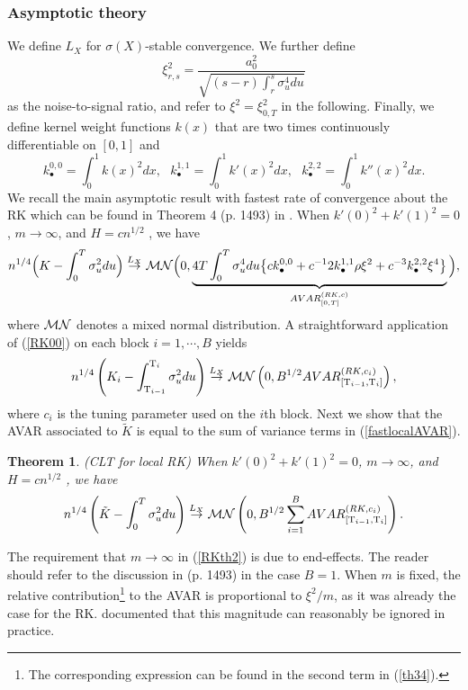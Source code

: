 \documentclass[11pt]{article}
\numberwithin{equation}{section}
\newcommand{\Tau}{\mathrm{T}}
\theoremstyle{plain}
\newtheorem{RK}[RK0]{Theorem}
\theoremstyle{remark}
\begin{document}
\subsubsection{Asymptotic theory}
We define $L_X$ for $\sigma(X)$-stable convergence. We further define 
$$\xi_{r,s}^2 = \frac{a_0^2}{\sqrt{ (s-r) \int_{r}^{s} \sigma_u^4 du}}$$
as the noise-to-signal ratio, and refer to $\xi^2 = \xi_{0,T}^2$ in the following. Finally, we define kernel weight functions $k(x)$ that are two times continuously differentiable on $[0,1]$ and 
$$k_{\bullet}^{0,0} = \int_0^1 k(x)^2 dx, \text{ } k_{\bullet}^{1,1} = \int_0^1 k'(x)^2 dx, \text{ } k_{\bullet}^{2,2} = \int_0^1 k''(x)^2 dx.$$
We recall the main asymptotic result with fastest rate of convergence about the RK which can be found in Theorem 4 (p. 1493) in \cite{barndorff2008designing}. When $k'(0)^2 + k'(1)^2 =0$, $m \rightarrow \infty$, and $H = c n^{1/2}$
, we have
\begin{eqnarray}
\label{RK00}
n^{1/4} \Big( K - \int_0^T \sigma_u^2 du \Big) \overset{L_X}{\rightarrow} {\cal M}{\cal N} \Big(0, \underbrace{4T \int_0^T \sigma_u^4 du \big\{ c k_{\bullet}^{0,0} + c^{-1} 2 k_{\bullet}^{1,1} \rho \xi^2 + c^{-3} k_{\bullet}^{2,2} \xi^4 \big\}}_{AVAR_{[0,T]}^{(RK,c)}} \Big),
\end{eqnarray}
where ${\cal M}{\cal N}$ denotes a mixed normal distribution. A straightforward application of (\ref{RK00}) on each block $i=1, \cdots, B$ yields
\begin{eqnarray}
\label{fastlocalAVAR}
n^{1/4} \l(K_i - \int_{\Tau_{i-1}}^{\Tau_i} \sigma_u^2 du \r) \overset{L_X}{\rightarrow} \calm\caln \l(0, B^{1/2} AVAR_{[\Tau_{i-1}, \Tau_i]}^{(RK,c_i)} \r),
\end{eqnarray}
where $c_i$ is the tuning parameter used on the $i$th block. Next we show that the AVAR associated to $\tilde{K}$ is equal to the sum of variance terms in (\ref{fastlocalAVAR}).
\begin{RK}
\label{RKth} (CLT for local RK) When $k'(0)^2 + k'(1)^2 =0$, $m \rightarrow \infty$, and $H = c n^{1/2}$
, we have
\begin{eqnarray}
\label{RKth2}
n^{1/4} \l( \tilde{K} - \int_0^T \sigma_u^2 du \r) \overset{L_X}{\rightarrow}  \calm\caln \l(0, B^{1/2} \sum_{i=1}^B AVAR_{[\Tau_{i-1}, \Tau_i]}^{(RK,c_i)}\r).
\end{eqnarray}
\end{RK}
\begin{remark}
The requirement that $m \rightarrow \infty$ in (\ref{RKth2}) is due to end-effects. The reader should refer to the discussion in \cite{barndorff2008designing} (p. 1493) in the case $B=1$. When $m$ is fixed, the relative contribution\footnote{The corresponding expression can be found in the second term in (\ref{th34}).} to the AVAR is proportional to $\xi^2/m$, as it was already the case for the RK. \cite{barndorff2009realized} documented that this magnitude can reasonably be ignored in practice.
\end{remark}
\end{document}
